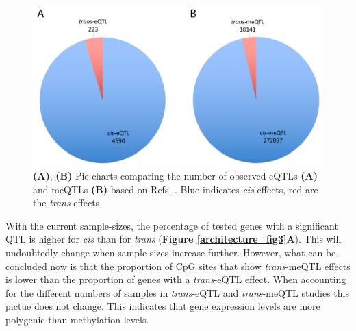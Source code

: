 \begin{figure}[H]
	\includegraphics[width=\textwidth]{chapters/chapter2-genetic-architecture/img/Figure2.png}
	\caption{\textbf{(A)}, \textbf{(B)} Pie charts comparing the number of observed eQTLs \textbf{(A)} and meQTLs \textbf{(B)} based on Refs. \cite{zhernakovaIdentificationContextdependentExpression2017,wongInterplayCisTrans2017}. Blue indicates \textit{cis} effects, red are the \textit{trans} effects.}
	\label{architecture_fig2}
\end{figure}



With the current sample-sizes, the percentage of tested genes with a significant QTL is higher for \textit{cis} than for \textit{trans} (\textbf{Figure \ref{architecture_fig3}A}). This will undoubtedly change when sample-sizes increase further. However, what can be concluded now is that the proportion of CpG sites that show \textit{trans}-meQTL effects is lower than the proportion of genes with a \textit{trans}-eQTL effect. When accounting for the different numbers of samples in \textit{trans}-eQTL and \textit{trans}-meQTL studies this pictue does not change. This indicates that gene expression levels are more polygenic than methylation levels. 

